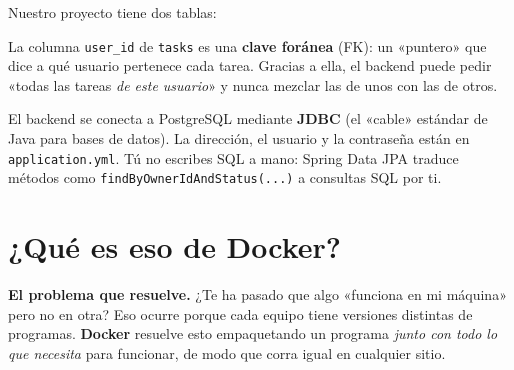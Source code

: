 \documentclass[11pt,a4paper]{article}
\begin{document}
Nuestro proyecto tiene dos tablas:

\begin{center}
\end{center}

La columna \verb|user_id| de \verb|tasks| es una \textbf{clave foránea} (FK): un
«puntero» que dice a qué usuario pertenece cada tarea. Gracias a ella, el backend
puede pedir «todas las tareas \emph{de este usuario}» y nunca mezclar las de unos
con las de otros.

\begin{nota}
El backend se conecta a PostgreSQL mediante \textbf{JDBC} (el «cable» estándar de
Java para bases de datos). La dirección, el usuario y la contraseña están en
\verb|application.yml|. Tú no escribes SQL a mano: Spring Data JPA traduce
métodos como \verb|findByOwnerIdAndStatus(...)| a consultas SQL por ti.
\end{nota}

\section{¿Qué es eso de Docker?}

\textbf{El problema que resuelve.} ¿Te ha pasado que algo «funciona en mi
máquina» pero no en otra? Eso ocurre porque cada equipo tiene versiones
distintas de programas. \textbf{Docker} resuelve esto empaquetando un programa
\emph{junto con todo lo que necesita} para funcionar, de modo que corra igual en
cualquier sitio.
\end{document}
